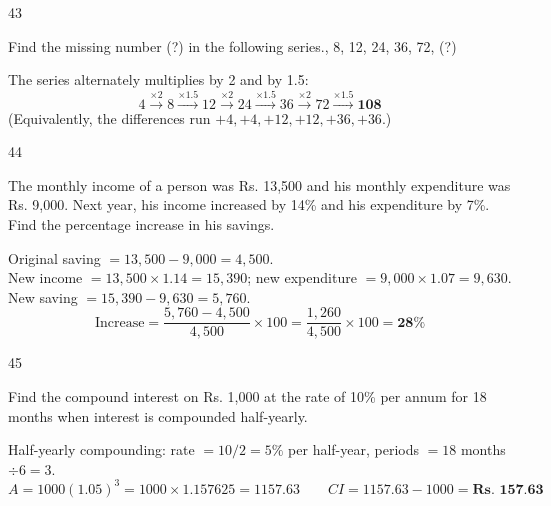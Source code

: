 \begin{question}{43}
{Find the missing number (?) in the following series., 8, 12, 24, 36, 72, (?)\par}
\begin{explain}
The series alternately multiplies by 2 and by 1.5:
\[4\xrightarrow{\times2}8\xrightarrow{\times1.5}12\xrightarrow{\times2}24\xrightarrow{\times1.5}36\xrightarrow{\times2}72\xrightarrow{\times1.5}\mathbf{108}\]
(Equivalently, the differences run $+4,+4,+12,+12,+36,+36$.)
\end{explain}
\end{question}

\begin{question}{44}
{The monthly income of a person was Rs. 13,500 and his monthly expenditure was Rs. 9,000. Next year, his income increased by 14\% and his expenditure by 7\%. Find the percentage increase in his savings.\par}
\begin{explain}
Original saving $=13{,}500-9{,}000=4{,}500$.\\
New income $=13{,}500\times1.14=15{,}390$; new expenditure $=9{,}000\times1.07=9{,}630$.\\
New saving $=15{,}390-9{,}630=5{,}760$.
\[\text{Increase}=\frac{5{,}760-4{,}500}{4{,}500}\times100=\frac{1{,}260}{4{,}500}\times100=\mathbf{28\%}\]
\end{explain}
\end{question}

\begin{question}{45}
{Find the compound interest on Rs. 1,000 at the rate of 10\% per annum for 18 months when interest is compounded half-yearly.\par}
\begin{explain}
Half-yearly compounding: rate $=10/2=5\%$ per half-year, periods $=18$ months $\div 6 = 3$.
\[A=1000(1.05)^3=1000\times1.157625=1157.63\qquad CI=1157.63-1000=\textbf{Rs.\ 157.63}\]
\end{explain}
\end{question}

